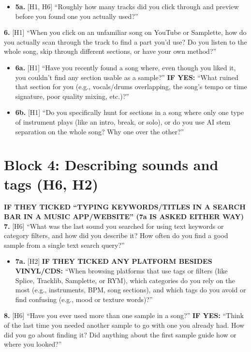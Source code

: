 \documentclass[12pt,a4paper]{report}
\newcommand{\cond}[1]{\textcolor{condition}{\textbf{#1}}}
\begin{document}
\begin{itemize}
  \item \textbf{5a.} [H1, H6] “Roughly how many tracks did you click through and preview before you found one you actually used?”
\end{itemize}

\textbf{6.} [H1] “When you click on an unfamiliar song on YouTube or Samplette, how do you actually scan through the track to find a part you’d use? Do you listen to the whole song, skip through different sections, or have your own method?”

\begin{itemize}
  \item \textbf{6a.} [H1] “Have you recently found a song where, even though you liked it, you couldn’t find any section usable as a sample?” \cond{IF YES:} “What ruined that section for you (e.g., vocals/drums overlapping, the song’s tempo or time signature, poor quality mixing, etc.)?”
  \item \textbf{6b.} [H1] “Do you specifically hunt for sections in a song where only one type of instrument plays (like an intro, break, or solo), or do you use AI stem separation on the whole song? Why one over the other?”
\end{itemize}

\section{Block 4: Describing sounds and tags (H6, H2)}

\cond{IF THEY TICKED “TYPING KEYWORDS/TITLES IN A SEARCH BAR IN A MUSIC APP/WEBSITE” (7a IS ASKED EITHER WAY)} \textbf{7.} [H6] “What was the last sound you searched for using text keywords or category filters, and how did you describe it? How often do you find a good sample from a single text search query?”

\begin{itemize}
  \item \textbf{7a.} [H2] \cond{IF THEY TICKED ANY PLATFORM BESIDES VINYL/CDS:} “When browsing platforms that use tags or filters (like Splice, Tracklib, Samplette, or RYM), which categories do you rely on the most (e.g., instruments, BPM, song sections), and which tags do you avoid or find confusing (e.g., mood or texture words)?”
\end{itemize}

\textbf{8.} [H6] “Have you ever used more than one sample in a song?” \cond{IF YES:} “Think of the last time you needed another sample to go with one you already had. How did you go about finding it? Did anything about the first sample guide how or where you looked?”
\end{document}
